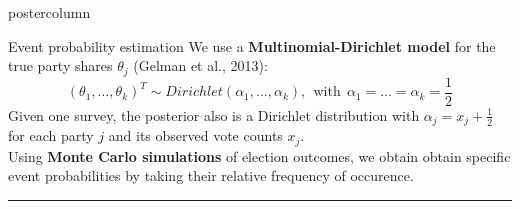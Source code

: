 \documentclass[final,hyperref={pdfpagelabels=false}]{beamer}
\newcommand{\bfBlue}[1]{\textcolor{koaladarkestblue}{\textbf{#1}}}
\newcommand*\circled[1]{\tikz[baseline=(char.base)]{
\node[shape=circle,draw,inner sep=2pt] (char) {#1};}}
\begin{document}
\begin{frame}
\begin{columns}
\begin{column}{1\textwidth}
\begin{columns}[T]
\begin{column}{.484\textwidth}
\begin{beamercolorbox}[center,wd=\textwidth]{postercolumn}
\begin{minipage}[T]{.95\textwidth}
\begin{block}{\footnotesize \circled{1} Event probability estimation}
We use a \bfBlue{Multinomial-Dirichlet model}
for the true party shares $\theta_j$ {\footnotesize (Gelman et al., 2013)}:
$$
(\theta_1,\ldots,\theta_k)^T \sim Dirichlet(\alpha_1,\ldots,\alpha_k), \ \ \text{with} \ \ \alpha_1 = \ldots = \alpha_k = \frac{1}{2}
$$
Given one survey, the posterior also is a Dirichlet distribution
with $\alpha_j = x_j + \frac{1}{2}$ for each party $j$ and its observed
vote counts $x_j$.
\\[0.5cm]
Using \bfBlue{Monte Carlo simulations} of election outcomes, we obtain obtain
specific event probabilities by taking their relative frequency of
occurence.

\vspace{1ex}
\textcolor{LMUlightgray}{\hrule{}}
\vspace{3ex}


\end{block}
\end{minipage}
\end{beamercolorbox}
\end{column}
\end{columns}
\end{column}
\end{columns}
\end{frame}
\end{document}
